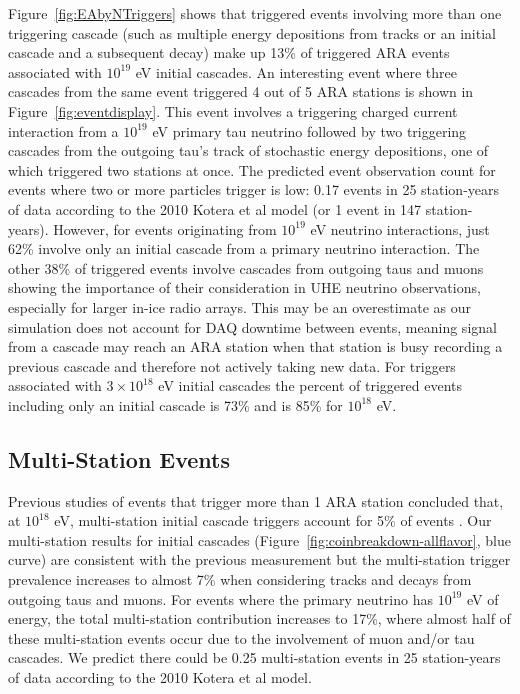     Figure~\ref{fig:EAbyNTriggers} shows that triggered events involving more than one triggering cascade (such as multiple energy depositions from tracks or an initial cascade and a subsequent decay) make up 13\% of triggered ARA events associated with $10^{19}$ eV initial cascades.
    An interesting event where three cascades from the same event triggered 4 out of 5 ARA stations is shown in Figure~\ref{fig:eventdisplay}.
    This event involves a triggering charged current interaction from a $10^{19}$ eV primary tau neutrino followed by two triggering cascades from the outgoing tau's track of stochastic energy depositions, one of which triggered two stations at once.
    The predicted event observation count for events where two or more particles trigger is low: 0.17 events in 25 station-years of data according to the 2010 Kotera et al model (or 1 event in 147 station-years).
    However, for events originating from $10^{19}$ eV neutrino interactions, just 62\% involve only an initial cascade from a primary neutrino interaction.
    The other 38\% of triggered events involve cascades from outgoing taus and muons showing the importance of their consideration in UHE neutrino observations, especially for larger in-ice radio arrays.
    This may be an overestimate as our simulation does not account for DAQ downtime between events, meaning signal from a cascade may reach an ARA station when that station is busy recording a previous cascade and therefore not actively taking new data.
    For triggers associated with $3\times10^{18}$ eV initial cascades the percent of triggered events including only an initial cascade is 73\% and is 85\% for $10^{18}$ eV.

  \subsection{Multi-Station Events}

    Previous studies of events that trigger more than 1 ARA station concluded that, at $10^{18}$ eV, multi-station initial cascade triggers account for 5\% of events \citep{ara_a23_10mo}.
    Our multi-station results for initial cascades (Figure~\ref{fig:coinbreakdown-allflavor}, blue curve) are consistent with the previous measurement but the multi-station trigger prevalence increases to almost 7\% when considering tracks and decays from outgoing taus and muons.
    For events where the primary neutrino has $10^{19}$ eV of energy, the total multi-station contribution increases to 17\%, where almost half of these multi-station events occur due to the involvement of muon and/or tau cascades.
    We predict there could be 0.25 multi-station events in 25 station-years of data according to the 2010 Kotera et al model.

